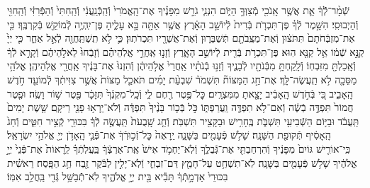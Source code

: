 \documentclass[twoside, openany, parskip=half, 11pt]{book}
\begin{document}
\begin{footnotesize}
\begin{multicols}{2}
שְֿׁמָ֨ר־לְֿֿךָ֔ אֵ֛ת אֲשֶׁ֥ר אָֽנֹכִ֖י מְֿצַוְּךָ֣ הַיּ֑וֹם הִנְנִ֧י גֹרֵ֣שׁ מִפָּנֶ֗יךָ אֶת־הָֽאֱמֹרִי֙ וְֿהַֽכְּֿנַֽעֲנִ֔י וְֿהַֽחִתִּי֙ וְֿהַפְּֿרִזִּ֔י וְֿהַֽחִוִּ֖י וְֿהַיְבוּסִֽי׃ הִשָּׁ֣מֶר לְֿךָ֗ פֶּן־תִּכְרֹ֤ת בְּֿרִית֙ לְֿיוֹשֵׁ֣ב הָאָ֔רֶץ אֲשֶׁ֥ר אַתָּ֖ה בָּ֣א עָלֶ֑יהָ פֶּן־יִֽהְיֶ֥ה לְֿמוֹקֵ֖שׁ בְּֿקִרְבֶּֽךָ׃ כִּ֤י אֶת־מִזְבְּֿחֹתָם֙ תִּתֹּצ֔וּן וְֿאֶת־מַצֵּֽבֹתָ֖ם תְּֿשַׁבֵּר֑וּן וְֿאֶת־אֲשֵׁרָ֖יו תִּכְרֹתֽוּן׃ כִּ֛י לֹ֥א תִֽשְׁתַּֽחֲוֶ֖ה לְֿאֵ֣ל אַחֵ֑ר כִּ֤י יְיָ֙ קַנָּ֣א שְֿׁמ֔וֹ אֵ֥ל קַנָּ֖א הֽוּא׃ פֶּן־תִּכְרֹ֥ת בְּֿרִ֖ית לְֿיוֹשֵׁ֣ב הָאָ֑רֶץ וְֿזָנ֣וּ אַֽחֲרֵ֣י אֱלֹֽהֵיהֶ֗ם וְֿזָבְֿחוּ֙ לֵאלֹ֣הֵיהֶ֔ם וְֿקָרָ֣א לְֿךָ֔ וְֿאָֽכַלְתָּ֖ מִזִּבְחֽוֹ׃ וְֿלָֽקַחְתָּ֥ מִבְּֿנֹתָ֖יו לְֿבָנֶ֑יךָ וְֿזָנ֣וּ בְֿנֹתָ֗יו אַֽחֲרֵי֙ אֱלֹ֣הֵיהֶ֔ן וְֿהִזְנוּ֙ אֶת־בָּנֶ֔יךָ אַֽחֲרֵ֖י אֱלֹֽהֵיהֶֽן׃ אֱלֹהֵ֥י מַסֵּכָ֖ה לֹ֥א תַֽעֲשֶׂה־לָּֽךְ׃  אֶת־חַ֣ג הַמַּצּוֹת֘ תִּשְׁמֹר֒ שִׁבְעַ֨ת יָמִ֜ים תֹּאכַ֤ל מַצּוֹת֙ אֲשֶׁ֣ר צִוִּיתִ֔ךָ לְֿמוֹעֵ֖ד חֹ֣דֶשׁ הָֽאָבִ֑יב כִּ֚י בְּֿחֹ֣דֶשׁ הָֽאָבִ֔יב יָצָ֖אתָ מִמִּצְרָֽיִם׃ כׇּל־פֶּ֥טֶר רֶ֖חֶם לִ֑י וְֿכָֽל־מִקְנְֿךָ֙ תִּזָּכָ֔ר פֶּ֖טֶר שׁ֥וֹר וָשֶֽׂה׃ וּפֶ֤טֶר חֲמוֹר֙ תִּפְדֶּ֣ה בְֿשֶׂ֔ה וְֿאִם־לֹ֥א תִפְדֶּ֖ה וַֽעֲרַפְתּ֑וֹ כֹּ֣ל בְּֿכ֤וֹר בָּנֶ֨יךָ֙ תִּפְדֶּ֔ה וְֿלֹא־יֵֽרָא֥וּ פָנַ֖י רֵיקָֽם׃ שֵׁ֤שֶׁת יָמִים֙ תַּֽעֲבֹ֔ד וּבַיּ֥וֹם הַשְּֿׁבִיעִ֖י תִּשְׁבֹּ֑ת בֶּֽחָרִ֥ישׁ וּבַקָּצִ֖יר תִּשְׁבֹּֽת׃ וְֿחַ֤ג שָֽׁבֻעֹת֙ תַּֽעֲשֶׂ֣ה לְֿךָ֔ בִּכּוּרֵ֖י קְֿצִ֣יר חִטִּ֑ים וְֿחַג֙ הָֽאָסִ֔יף תְּֿקוּפַ֖ת הַשָּׁנָֽה׃ שָׁל֥שׁ פְּֿעָמִ֖ים בַּשָּׁנָ֑ה יֵֽרָאֶה֙ כׇּל־זְֿכ֣וּרְֿךָ֔ אֶת־פְּֿֿנֵ֛י הָֽאָדֹ֥ן יְיָ֖ אֱלֹהֵ֥י יִשְׂרָאֵֽל׃ כִּֽי־אוֹרִ֤ישׁ גּוֹיִם֙ מִפָּנֶ֔יךָ וְֿהִרְחַבְתִּ֖י אֶת־גְּֿֿבֻלֶ֑ךָ וְֿלֹֽא־יַחְמֹ֥ד אִישׁ֙ אֶֽת־אַרְצְֿךָ֔ בַּֽעֲלֹֽתְֿךָ֗ לֵֽרָאוֹת֙ אֶת־פְּֿֿנֵי֙ יְיָ֣ אֱלֹהֶ֔יךָ שָׁל֥שׁ פְּֿעָמִ֖ים בַּשָּׁנָֽה׃ לֹֽא־תִשְׁחַ֥ט עַל־חָמֵ֖ץ דַּם־זִבְחִ֑י וְֿלֹֽא־יָלִ֣ין לַבֹּ֔קֶר זֶ֖בַח חַ֥ג הַפָּֽסַח׃ רֵאשִׁ֗ית בִּכּוּרֵי֙ אַדְמָ֣תְֿךָ֔ תָּבִ֕יא בֵּ֖ית יְיָ֣ אֱלֹהֶ֑יךָ לֹֽא־תְֿֿבַשֵּׁ֥ל גְּֿדִ֖י בַּֽחֲלֵ֥ב אִמּֽוֹ׃



\end{multicols}
\end{footnotesize}
\end{document}
